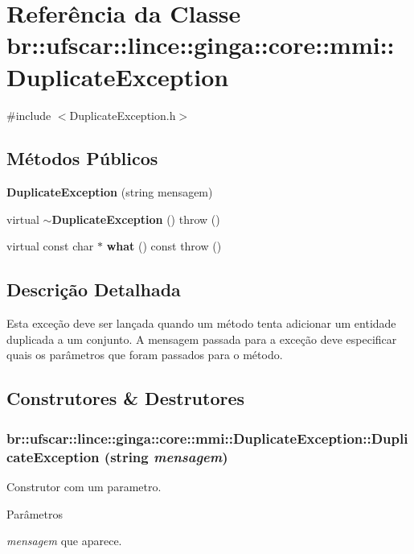 \section{Referência da Classe br::ufscar::lince::ginga::core::mmi::DuplicateException}
\label{classbr_1_1ufscar_1_1lince_1_1ginga_1_1core_1_1mmi_1_1DuplicateException}


{\ttfamily \#include $<$DuplicateException.h$>$}

\subsection*{Métodos Públicos}
\begin{DoxyCompactItemize}
\item 
{\bf DuplicateException} (string mensagem)
\item 
virtual {\bf $\sim$DuplicateException} ()  throw ()
\item 
virtual const char $\ast$ {\bf what} () const   throw ()
\end{DoxyCompactItemize}


\subsection{Descrição Detalhada}
Esta exceção deve ser lançada quando um método tenta adicionar um entidade duplicada a um conjunto. A mensagem passada para a exceção deve especificar quais os parâmetros que foram passados para o método. 

\subsection{Construtores \& Destrutores}
\subsubsection[{DuplicateException}]{\setlength{\rightskip}{0pt plus 5cm}br::ufscar::lince::ginga::core::mmi::DuplicateException::DuplicateException (string {\em mensagem})}\label{classbr_1_1ufscar_1_1lince_1_1ginga_1_1core_1_1mmi_1_1DuplicateException_a41116c5e92ee7bc8bd7930702560eff9}
Construtor com um parametro. 
\begin{DoxyParams}{Parâmetros}
\item[{\em mensagem}]que aparece. \end{DoxyParams}


